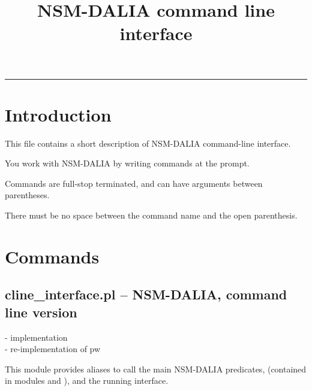 \documentclass[11pt]{article}
\title{NSM-DALIA command line interface}
\begin{document}
\maketitle
\hrule



\section{Introduction}

This file contains a short description of NSM-DALIA command-line interface.

You work with NSM-DALIA by writing commands at the prompt.

Commands are full-stop terminated, and can have arguments between parentheses.

There must be no space between the command name and the open parenthesis.

\section{Commands}

\subsection{cline_interface.pl -- NSM-DALIA, command line version}

\label{sec:clineinterface}

\begin{tags}
-  implementation \\- re-implementation of pw
\end{tags}

This module provides aliases to call the main NSM-DALIA predicates,
(contained in modules  and ), and
the running interface.\vspace{0.7cm}
\end{document}
